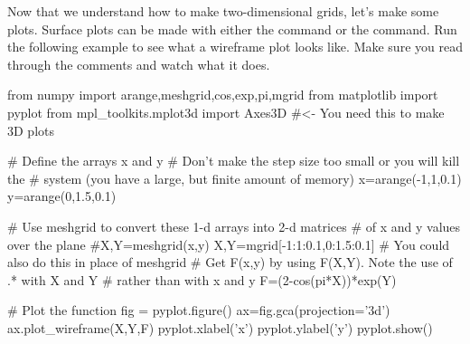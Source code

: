 Now that we understand how to make two-dimensional grids, let's make
some plots. Surface plots can be made with either the
 command or the 
command.  Run the following example to see what a wireframe plot looks
like. Make sure you read through the comments and watch what it does.

\begin{codeexample}
\begin{VerbatimOut}{\listingFile}
from numpy import arange,meshgrid,cos,exp,pi,mgrid
from matplotlib import pyplot
from mpl_toolkits.mplot3d import Axes3D  #<- You need this to make 3D plots

# Define the arrays x and y
# Don't make the step size too small or you will kill the
# system (you have a large, but finite amount of memory)
x=arange(-1,1,0.1)
y=arange(0,1.5,0.1)

# Use meshgrid to convert these 1-d arrays into 2-d matrices
# of x and y values over the plane
#X,Y=meshgrid(x,y)
X,Y=mgrid[-1:1:0.1,0:1.5:0.1]  # You could also do this in place of meshgrid
# Get F(x,y) by using F(X,Y). Note the use of .* with X and Y
# rather than with x and y
F=(2-cos(pi*X))*exp(Y)

# Plot the function
fig = pyplot.figure()
ax=fig.gca(projection='3d')
ax.plot_wireframe(X,Y,F)
pyplot.xlabel('x')
pyplot.ylabel('y')
pyplot.show()
\end{VerbatimOut}
\end{codeexample}


%
%
%
%
%

